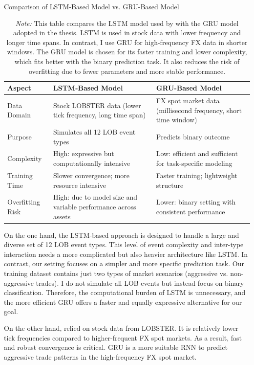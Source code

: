 \begin{table}[H]
\centering
\caption{Comparison of LSTM-Based Model vs. GRU-Based Model}
\caption*{\textit{Note:} This table compares the LSTM model used by \cite{lalor_event-based_2025} with the GRU model adopted in the thesis. LSTM is used in stock data with lower frequency and longer time spans. In contrast, I use GRU for high-frequency FX data in shorter windows. The GRU model is chosen for its faster training and lower complexity, which fits better with the binary prediction task. It also reduces the risk of overfitting due to fewer parameters and more stable performance.}

\begin{tabular}{p{3cm} p{5.5cm} p{5.5cm}}
\toprule
Aspect & LSTM-Based Model & GRU-Based Model \\
\midrule
Data Domain & Stock LOBSTER data (lower tick frequency, long time span) & FX spot market data (millisecond frequency, short time window) \\
Purpose & Simulates all 12 LOB event types & Predicts binary outcome \\
Complexity & High: expressive but computationally intensive & Low: efficient and sufficient for task-specific modeling \\
Training Time & Slower convergence; more resource intensive & Faster training; lightweight structure \\
Overfitting Risk & High: due to model size and variable performance across assets & Lower: binary setting with consistent performance \\
\bottomrule
\end{tabular}
\label{tab:gru_vs_lstm}
\end{table}

On the one hand, the LSTM-based approach is designed to handle a large and diverse set of 12 LOB event types. This level of event complexity and inter-type interaction needs a more complicated but also heavier architecture like LSTM. In contrast, our setting focuses on a simpler and more specific prediction task. Our training dataset contains just two types of market scenarios (aggressive vs. non-aggressive trades). I do not simulate all LOB events but instead focus on binary classification. Therefore, the computational burden of LSTM is unnecessary, and the more efficient GRU offers a faster and equally expressive alternative for our goal.

On the other hand, \cite{lalor_event-based_2025} relied on stock data from LOBSTER. It is relatively lower tick frequencies compared to higher-frequent FX spot markets. As a result, fast and robust convergence is critical. GRU is a more suitable RNN to predict aggressive trade patterns in the high-frequency FX spot market.


